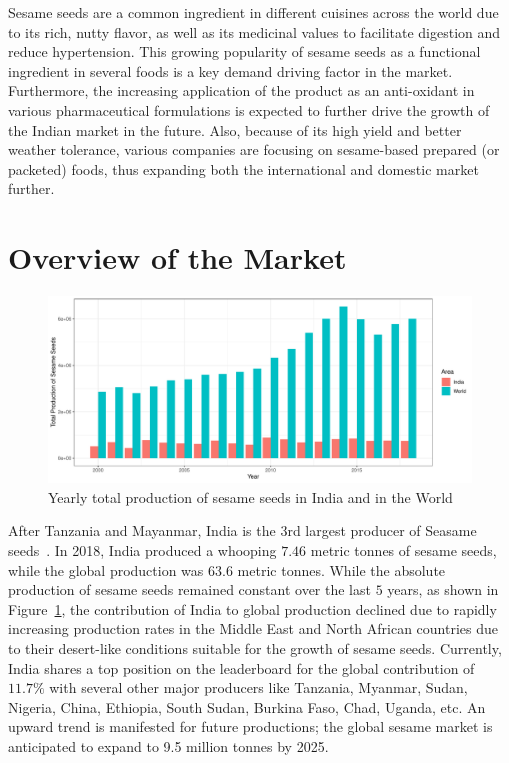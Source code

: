 \documentclass[12pt]{report}
\begin{document}
Sesame seeds are a common ingredient in different cuisines across the world due to its rich, nutty flavor, as well as its medicinal values to facilitate digestion and reduce hypertension. This growing popularity of sesame seeds as a functional ingredient in several foods is a key demand driving factor in the market.  Furthermore, the increasing application of the product as an anti-oxidant in various pharmaceutical formulations is expected to further drive the growth of the Indian market in the future. Also, because of its high yield and better weather tolerance, various companies are focusing on sesame-based prepared (or packeted) foods, thus expanding both the international and domestic market further.


\section{Overview of the Market}


\begin{figure}[h]
    \centering
    \includegraphics[width = 0.8\linewidth]{sesame-total.pdf}
    \caption{Yearly total production of sesame seeds in India and in the World}
    \label{fig:sesame-total}
\end{figure}


After Tanzania and Mayanmar, India is the 3rd largest producer of Seasame seeds~\cite{FAO-site}. In 2018, India produced a whooping $7.46$ metric tonnes of sesame seeds, while the global production was $63.6$ metric tonnes. While the absolute production of sesame seeds remained constant over the last $5$ years, as shown in Figure~\ref{fig:sesame-total}, the contribution of India to global production declined due to rapidly increasing production rates in the Middle East and North African countries due to their desert-like conditions suitable for the growth of sesame seeds. Currently, India shares a top position on the leaderboard for the global contribution of $11.7\%$ with several other major producers like Tanzania, Myanmar, Sudan, Nigeria, China, Ethiopia, South Sudan, Burkina Faso, Chad, Uganda, etc. An upward trend is manifested for future productions; the global sesame market is anticipated to expand to 9.5 million tonnes by 2025.
\end{document}

